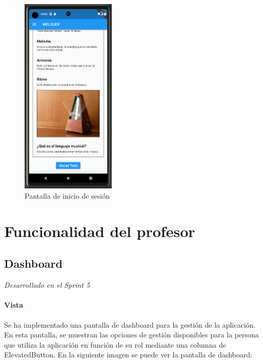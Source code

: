   \begin{figure}[H]
    \centering
    \includegraphics[width=0.4\textwidth]{imagenes/c7/leccion2.png}
    \caption{Pantalla de inicio de sesión}
    \label{fig:login}
\end{figure}

\section{Funcionalidad del profesor}

\subsection{Dashboard}
\textit{Desarrollado en el Sprint 5}

\label{sec:dashboard}
\paragraph*{Vista}
Se ha implementado una pantalla de dashboard para la gestión de la aplicación. En esta pantalla, se muestran las opciones de gestión disponibles para la persona que utiliza la aplicación en función de su rol mediante una columna de ElevatedButton. En la siguiente imagen se puede ver la pantalla de dashboard:

